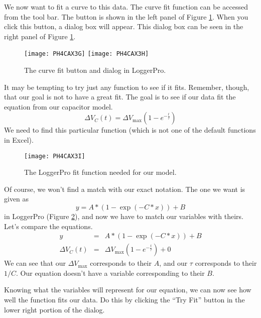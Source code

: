 We now want to fit a curve to
this data. The curve fit function can be accessed from the tool bar. The button
is shown in the left panel of Figure \ref{fig:curvefit}. When you click this
button, a dialog box will appear. This dialog box can be seen in the right
panel of Figure \ref{fig:curvefit}.

\begin{figure}[htbp!]
	\centering
\texttt{[image: PH4CAX3G]}
\texttt{[image: PH4CAX3H]}
	\caption{The curve fit button and dialog in LoggerPro.}
	\label{fig:curvefit}
\end{figure}

It may be tempting to try just any function to see if it fits. 
Remember, though, that our goal is
not to have a great fit. The goal is to see if our data fit the equation
from our capacitor model. 
\begin{equation*}
\Delta V_{C}\left( t\right) =\Delta V_{\max }\left( 1-e^{-\frac{t}{\tau }%
}\right)
\end{equation*}%
We need to find this particular function (which is not one of the default
functions in Excel).
\begin{figure}[tbp!]
	\centering
\texttt{[image: PH4CAX3I]}
	\caption{The LoggerPro fit function needed for our model.}
	\label{fig:fitfunction}
\end{figure}
Of course, we won't find a match
with our exact notation. The one we want is given as 
\begin{equation*}
y=A\ast (1-\exp (-C\ast x))+B
\end{equation*}%
in LoggerPro (Figure \ref{fig:fitfunction}), 
and now we have to match our variables with theirs. 
Let's compare the
equations. 
\begin{eqnarray*}
y &=&A\ast (1-\exp (-C\ast x))+B \\
\Delta V_{C}\left( t\right) &=&\Delta V_{\max }\left( 1-e^{-\frac{t}{\tau }%
}\right) +0
\end{eqnarray*}%
We can see that our $\Delta V_{\max }$ corresponds to their $A$, and our 
$\tau$ corresponds to their $1/C$. Our equation doesn't have a variable
corresponding to their $B$.

Knowing what the variables will represent for our equation, we can now see
how well the function fits our data. Do this by clicking the ``Try Fit'' button
in the lower right portion of the dialog. 

